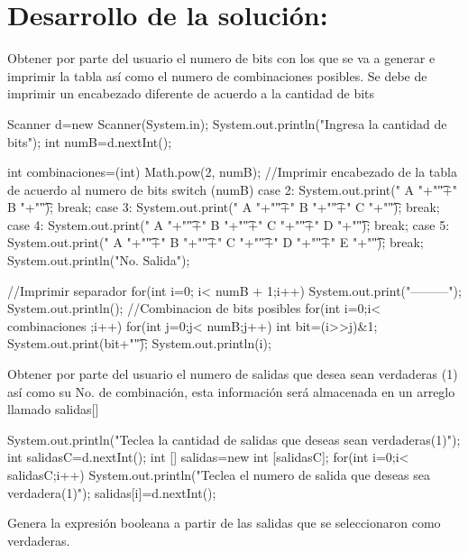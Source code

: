 \documentclass{IEEEcsmag}
\begin{document}
\section*{Desarrollo de la solución:}
Obtener por parte del usuario el numero de bits con los que se va a generar e imprimir la tabla así como el numero de combinaciones posibles. Se debe de imprimir un encabezado diferente de acuerdo a la cantidad de bits
\begin{javaCode}
Scanner d=new Scanner(System.in);
        System.out.println("Ingresa la cantidad de bits");
        int numB=d.nextInt();
        
        int combinaciones=(int) Math.pow(2, numB);
        //Imprimir encabezado de la tabla de acuerdo al numero de bits 
            switch (numB) {
                case 2:
                    System.out.print(" A "+"\t"+" B "+"\t");
                    break;
                case 3:
                    System.out.print(" A "+"\t"+" B "+"\t"+" C "+"\t");
                    break;
                case 4:
                    System.out.print(" A "+"\t"+" B "+"\t"+" C "+"\t"+" D "+"\t");
                    break;
                case 5:
                    System.out.print(" A "+"\t"+" B "+"\t"+" C "+"\t"+" D "+"\t"+" E "+"\t");
                    break;      
            }
        System.out.println("No. Salida");
        
        //Imprimir separador
        for(int i=0; i< numB + 1;i++){
        System.out.print("---------");
        }
        System.out.println();
        //Combinacion de bits posibles
        for(int i=0;i< combinaciones ;i++){
        for(int j=0;j< numB;j++){
        int bit=(i>>j)&1;
        System.out.print(bit+"\t");   
        }
        System.out.println(i);
        }
\end{javaCode}
Obtener por parte del usuario el numero de salidas que desea sean verdaderas (1) así como su No. de combinación, esta información será almacenada en un arreglo llamado salidas[]
\begin{javaCode}
System.out.println("Teclea la cantidad de salidas que deseas sean verdaderas(1)");
        int salidasC=d.nextInt();
        int [] salidas=new int [salidasC];
        for(int i=0;i< salidasC;i++){
        System.out.println("Teclea el numero de salida que deseas sea verdadera(1)");
        salidas[i]=d.nextInt();
        }
\end{javaCode}
\newpage
Genera la expresión booleana a partir de las salidas que se seleccionaron como verdaderas. 
\end{document}
